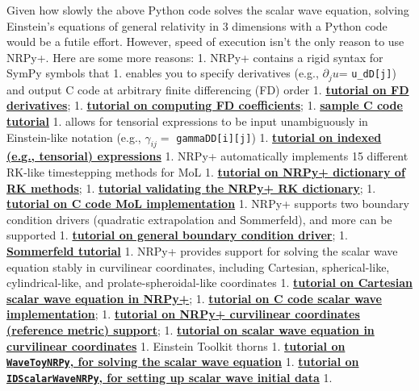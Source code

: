 \documentclass[landscape,letterpaper,10pt,english]{article}
\begin{document}
Given how slowly the above Python code solves the scalar wave equation,
solving Einstein's equations of general relativity in 3 dimensions with
a Python code would be a futile effort. However, speed of execution
isn't the only reason to use NRPy+. Here are some more reasons: 1. NRPy+
contains a rigid syntax for SymPy symbols that 1. enables you to specify
derivatives (e.g., \(\partial_j u\)= \texttt{u\_dD{[}j{]}}) and output C
code at arbitrary finite differencing (FD) order 1.
\href{Tutorial-Finite_Difference_Derivatives.ipynb}{\textbf{tutorial on
FD derivatives}}; 1.
\href{Tutorial-How_NRPy_Computes_Finite_Difference_Coeffs.ipynb}{\textbf{tutorial
on computing FD coefficients}}; 1.
\href{Tutorial-Start_to_Finish-Finite_Difference_Playground.ipynb}{\textbf{sample
C code tutorial}} 1. allows for tensorial expressions to be input
unambiguously in Einstein-like notation (e.g., \(\gamma_{ij}=\)
\texttt{gammaDD{[}i{]}{[}j{]}}) 1.
\href{Tutorial-Indexed_Expressions.ipynb}{\textbf{tutorial on indexed
(e.g., tensorial) expressions}} 1. NRPy+ automatically implements 15
different RK-like timestepping methods for MoL 1.
\href{Tutorial-RK_Butcher_Table_Dictionary.ipynb}{\textbf{tutorial on
NRPy+ dictionary of RK methods}}; 1.
\href{Tutorial-RK_Butcher_Table_Validation.ipynb}{\textbf{tutorial
validating the NRPy+ RK dictionary}}; 1.
\href{Tutorial-Method_of_Lines-C_Code_Generation.ipynb}{\textbf{tutorial
on C code MoL implementation}} 1. NRPy+ supports two boundary condition
drivers (quadratic extrapolation and Sommerfeld), and more can be
supported 1.
\href{Tutorial-Start_to_Finish-Curvilinear_BCs.ipynb}{\textbf{tutorial
on general boundary condition driver}}; 1.
\href{Tutorial-SommerfeldBoundaryCondition.ipynb}{\textbf{Sommerfeld
tutorial}} 1. NRPy+ provides support for solving the scalar wave
equation stably in curvilinear coordinates, including Cartesian,
spherical-like, cylindrical-like, and prolate-spheroidal-like
coordinates 1. \href{Tutorial-ScalarWave.ipynb}{\textbf{tutorial on
Cartesian scalar wave equation in NRPy+}}; 1.
\href{Tutorial-Start_to_Finish-ScalarWave.ipynb}{\textbf{tutorial on C
code scalar wave implementation}}; 1.
\href{Tutorial-Reference_Metric.ipynb}{\textbf{tutorial on NRPy+
curvilinear coordinates (reference metric) support}}; 1.
\href{Tutorial-ScalarWaveCurvilinear.ipynb}{\textbf{tutorial on scalar
wave equation in curvilinear coordinates}} 1. Einstein Toolkit thorns 1.
\href{Tutorial-ETK_thorn-WaveToyNRPy.ipynb}{\textbf{tutorial on
\texttt{WaveToyNRPy}, for solving the scalar wave equation}} 1.
\href{Tutorial-ETK_thorn-IDScalarWaveNRPy.ipynb}{\textbf{tutorial on
\texttt{IDScalarWaveNRPy}, for setting up scalar wave initial data}} 1.
\end{document}
